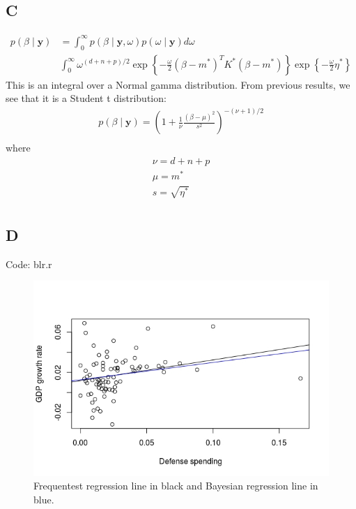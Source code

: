 \documentclass{article}
\begin{document}
\subsection*{C}
\begin{align*}
p(\beta \mid \mathbf{y}) &= \int_{0}^{\infty} p(\beta \mid \mathbf{y}, \omega) p(\omega \mid \mathbf{y}) d\omega\\
& \int_{0}^{\infty} \omega^{(d+n+p)/2} \exp \left\lbrace -\frac{\omega}{2}(\beta - m^*)^T K^* (\beta - m^*) \right\rbrace \exp \left\lbrace -\frac{\omega}{2} \eta^* \right\rbrace
\end{align*}
This is an integral over a Normal gamma distribution. From previous results, we see that it is a Student t distribution:
\begin{align*}
p(\beta \mid \mathbf{y}) = \left(1 + \frac{1}{\nu}\frac{(\beta-\mu)^2}{s^2}\right)^{-(\nu+1)/2}\\
\end{align*}
where 
\begin{align*}
\nu = d + n + p\\
\mu = m^*\\
s = \sqrt{\eta^*}\\
\end{align*}

\subsection*{D}
Code: blr.r
\begin{figure}[h!]
\includegraphics[width=\linewidth]{blm.jpeg}
\caption{Frequentest regression line in black and Bayesian regression line in blue.}
\end{figure}
\end{document}

